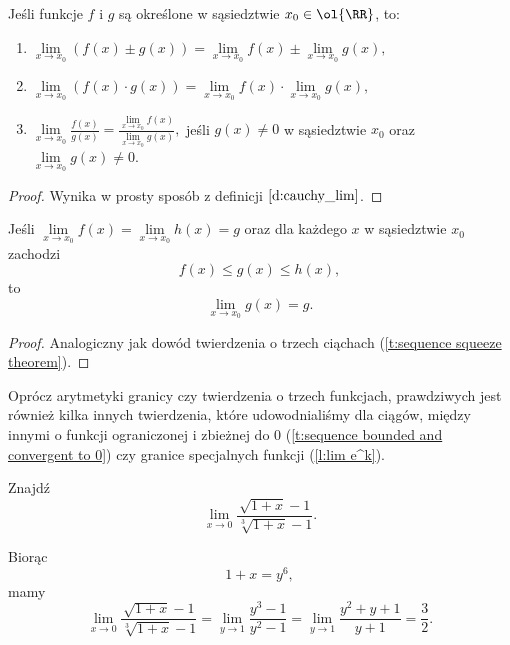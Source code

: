 \begin{theorem}
    Jeśli funkcje $f$ i $g$ są określone w sąsiedztwie $x_0 \in \ol{\RR}$, to:
    \begin{enumerate}
        \item $\lim\limits_{x\to x_0} (f(x) \pm g(x)) = \lim\limits_{x\to x_0} f(x) \pm \lim\limits_{x\to x_0} g(x),$
        \item $\lim\limits_{x\to x_0} (f(x) \cdot g(x)) = \lim\limits_{x\to x_0} f(x) \cdot \lim\limits_{x\to x_0} g(x),$
        \item $\lim\limits_{x\to x_0} \frac{f(x)}{g(x)} = \frac{\lim\limits_{x\to x_0} f(x)}{\lim\limits_{x\to x_0} g(x)},$ jeśli $g(x) \neq 0$ w sąsiedztwie $x_0$ oraz $\lim\limits_{x\to x_0} g(x) \neq 0$.
    \end{enumerate}
\end{theorem}
\begin{proof}
    Wynika w prosty sposób z definicji $\ref{d:cauchy_lim}$.
\end{proof}

\begin{theorem}
    \label{t:squeeze theorem}
    Jeśli $\lim\limits_{x\to x_0} f(x) = \lim\limits_{x\to x_0} h(x) = g$ oraz dla każdego $x$ w sąsiedztwie $x_0$ zachodzi
    \[ f(x) \leq g(x) \leq h(x), \]
    to
    \[ \lim\limits_{x\to x_0} g(x) = g. \]
\end{theorem}
\begin{proof}
    Analogiczny jak dowód twierdzenia o trzech ciąchach (\ref{t:sequence squeeze theorem}).
\end{proof}

\begin{remark}
    Oprócz arytmetyki granicy czy twierdzenia o trzech funkcjach, prawdziwych jest również kilka innych twierdzenia, które udowodnialiśmy dla ciągów, między innymi o funkcji ograniczonej i zbieżnej do $0$ (\ref{t:sequence bounded and convergent to 0}) czy granice specjalnych funkcji (\ref{l:lim e^k}).
\end{remark}

\begin{example}  %
    Znajdź
    \[ \lim_{x \to 0} \frac{\sqrt{1+ x} - 1}{\sqrt[3]{1 + x} - 1}. \]
\end{example}
\begin{solution}
    Biorąc
    \[ 1 + x = y^6, \]
    mamy
    \[ \lim_{x \to 0} \frac{\sqrt{1+ x} - 1}{\sqrt[3]{1 + x} - 1} = \lim_{y \to 1} \frac{y^3 - 1}{y^2 - 1} = \lim_{y \to 1} \frac{y^2 + y + 1}{y + 1} = \frac{3}{2}. \]
\end{solution}

